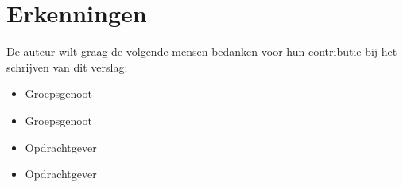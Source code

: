 \documentclass[10pt]{article}
\title{\titlecap{\scshape Project Robotica}\normalfont}
\author{Wessel Tip $<$contact@wessel.gg$>$ (\url{https://wessel.gg/}) \\
Technische Informatica \\
Hoogeschool Inholland Alkmaar \\
 Jaar 2, Semester 2 (Jan. 2024 - Jun. 2024)
}
\begin{document}
\maketitle



\tableofcontents
\newpage








\section*{Erkenningen}
\label{sec:erkenningen}
De auteur wilt graag de volgende mensen bedanken voor hun contributie bij het schrijven van dit verslag:
\begin{itemize}
  \item[]  Groepsgenoot
  \item[]  Groepsgenoot
  \item[]  Opdrachtgever
  \item[]  Opdrachtgever
\end{itemize}

\label{sec:referenties}




\end{document}
